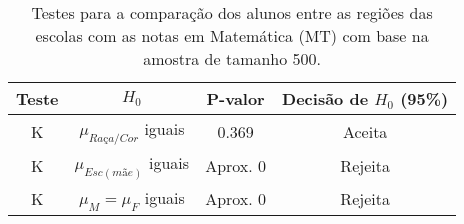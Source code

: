 



\begin{table}[htb]
\caption{\label{teste_MT}Testes para a comparação dos alunos entre as regiões das escolas com as notas em Matemática (MT) com base na amostra de tamanho 500.}
    \centering
    \begin{tabular}{cccc}
    \toprule
    Teste & $H_0$& P-valor & Decisão de $H_0$ (95\%)\\
    \midrule \midrule
    K & $\mu_{Raça/Cor}$ iguais & 0.369 & Aceita\\
    K & $\mu_{Esc(mãe)}$ iguais & Aprox. 0 & Rejeita\\
    K & $\mu_M = \mu_F$ iguais & Aprox. 0 & Rejeita\\
    \bottomrule
    \end{tabular}
\end{table}


